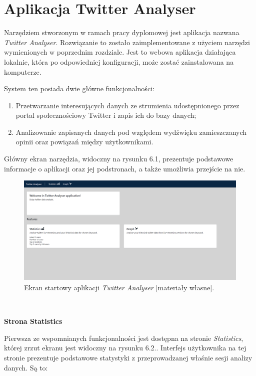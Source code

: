 \chapter{Aplikacja Twitter Analyser}
\qquad Narzędziem stworzonym w ramach pracy dyplomowej jest aplikacja nazwana \textit{Twitter Analyser}. Rozwiązanie to zostało zaimplementowane z użyciem narzędzi wymienionych w poprzednim rozdziale. Jest to webowa aplikacja działająca lokalnie, która po odpowiedniej konfiguracji, może zostać zainstalowana na komputerze. 

System ten posiada dwie główne funkcjonalności:

\begin{enumerate}
	\item Przetwarzanie interesujących danych ze strumienia udostępnionego przez portal społecznościowy Twitter i zapis ich do bazy danych;
	\item Analizowanie zapisanych danych pod względem wydźwięku zamieszczanych opinii oraz powiązań między użytkownikami.
\end{enumerate}

Główny ekran narzędzia, widoczny na rysunku 6.1, prezentuje podstawowe informacje o aplikacji oraz jej podstronach, a także umożliwia przejście na nie.

\begin{figure}[h] %
	\centering
	\includegraphics[width=1.0\linewidth]{img/twitter_analyser_1}
	\caption{Ekran startowy aplikacji \textit{Twitter Analyser} [materiały własne].}
\end{figure}

\textcolor{white}{.}

\textbf{Strona Statistics}

Pierwsza ze wspomnianych funkcjonalności jest dostępna na stronie \textit{Statistics}, której zrzut ekranu jest widoczny na rysunku 6.2.. Interfejs użytkownika na tej stronie prezentuje podstawowe statystyki z przeprowadzanej właśnie sesji analizy danych. Są to:

